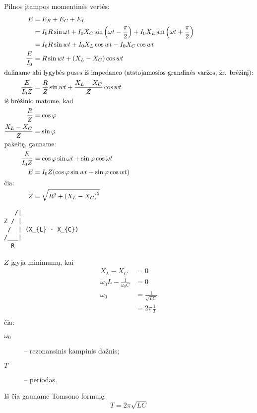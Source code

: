 Pilnos įtampos momentinės vertės:
\begin{align*}
  E
    &= E_{R} + E_{C} + E_{L} \\
    &=  I_{0} R \sin \omega t +
        I_{0} X_{C} \sin \left( \omega t - \frac{\pi}{2} \right) +
        I_{0} X_{L} \sin \left( \omega t + \frac{\pi}{2} \right) \\
    &=  I_{0}R \sin wt + I_{0} X_{L} \cos wt - I_{0} X_{C} \cos wt \\
  \frac{E}{I_{0}}
    &= R \sin wt + (X_{L} - X_{C})\cos wt \\
  \intertext{daliname abi lygybės puses iš impedanco (atstojamosios
  grandinės varžos, žr. brėžinį):}
  \frac{E}{I_{0}Z}
    &= \frac{R}{Z} \sin wt + \frac{X_{L} - X_{C}}{Z} \cos wt \\
  \intertext{iš brėžinio matome, kad}
  \frac{R}{Z}
    &= \cos \varphi \\
  \frac{X_{L} - X_{C}}{Z}
    &= \sin \varphi \\
  \intertext{pakeitę, gauname:}
  \frac{E}{I_{0}Z}
    &= \cos \varphi \sin \omega t + \sin \varphi \cos \omega t \\
  E
    &= I_{0} Z ( \cos \varphi \sin wt + \sin \varphi \cos wt ) \\
  \intertext{čia:}
  Z
    &= \sqrt{R^{2} + \left( X_{L} - X_{C} \right)^{2}} \\
\end{align*}

\begin{verbatim}
   /|
Z / |
 /  | (X_{L} - X_{C})
/___|
  R
\end{verbatim}

$Z$ įgyja minimumą, kai
\begin{align*}
  X_{L} - X_{C}
    &= 0 \\
  \omega_{0} L - \frac{1}{\omega_{0}C}
    &= 0 \\
  \omega_{0}
    &= \frac{1}{\sqrt{LC}} \\
    &= 2 \pi \frac{1}{T} \\
\end{align*}
čia:
\begin{description}
  \item[$\omega_{0}$] – rezonansinis kampinis dažnis;
  \item[$T$] – periodas.
\end{description}

Iš čia gauname Tomsono formulę:
\begin{equation*}
  T = 2 \pi \sqrt{LC}
\end{equation*}

